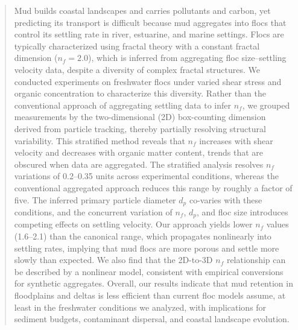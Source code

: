 \documentclass{agujournal2019}
\begin{document}
\begin{abstract}
Mud builds coastal landscapes and carries pollutants and carbon, yet predicting its transport is difficult because mud aggregates into flocs that control its settling rate in river, estuarine, and marine settings. Flocs are typically characterized using fractal theory with a constant fractal dimension ($n_f = 2.0$), which is inferred from aggregating floc size--settling velocity data, despite a diversity of complex fractal structures. We conducted experiments on freshwater flocs under varied shear stress and organic concentration to characterize this diversity. Rather than the conventional approach of aggregating settling data to infer $n_f$, we grouped measurements by the two-dimensional (2D) box-counting dimension derived from particle tracking, thereby partially resolving structural variability. This stratified method reveals that $n_f$ increases with shear velocity and decreases with organic matter content, trends that are obscured when data are aggregated. The stratified analysis resolves $n_f$ variations of 0.2--0.35 units across experimental conditions, whereas the conventional aggregated approach reduces this range by roughly a factor of five. The inferred primary particle diameter $d_p$ co-varies with these conditions, and the concurrent variation of $n_f$, $d_p$, and floc size introduces competing effects on settling velocity. Our approach yields lower $n_f$ values (1.6--2.1) than the canonical range, which propagates nonlinearly into settling rates, implying that mud flocs are more porous and settle more slowly than expected. We also find that the 2D-to-3D $n_f$ relationship can be described by a nonlinear model, consistent with empirical conversions for synthetic aggregates. Overall, our results indicate that mud retention in floodplains and deltas is less efficient than current floc models assume, at least in the freshwater conditions we analyzed, with implications for sediment budgets, contaminant dispersal, and coastal landscape evolution.
\end{abstract}
\end{document}
